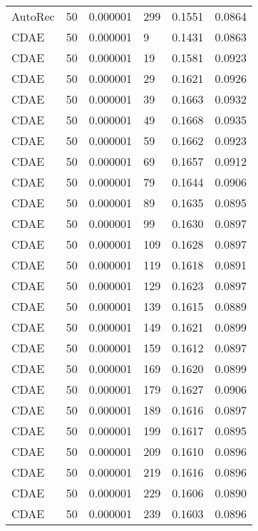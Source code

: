 \begin{tabular}{llrlrr}
 AutoRec &   50 &  0.000001 &   299 &  0.1551 &       0.0864 \\
    CDAE &   50 &  0.000001 &     9 &  0.1431 &       0.0863 \\
    CDAE &   50 &  0.000001 &    19 &  0.1581 &       0.0923 \\
    CDAE &   50 &  0.000001 &    29 &  0.1621 &       0.0926 \\
    CDAE &   50 &  0.000001 &    39 &  0.1663 &       0.0932 \\
    CDAE &   50 &  0.000001 &    49 &  0.1668 &       0.0935 \\
    CDAE &   50 &  0.000001 &    59 &  0.1662 &       0.0923 \\
    CDAE &   50 &  0.000001 &    69 &  0.1657 &       0.0912 \\
    CDAE &   50 &  0.000001 &    79 &  0.1644 &       0.0906 \\
    CDAE &   50 &  0.000001 &    89 &  0.1635 &       0.0895 \\
    CDAE &   50 &  0.000001 &    99 &  0.1630 &       0.0897 \\
    CDAE &   50 &  0.000001 &   109 &  0.1628 &       0.0897 \\
    CDAE &   50 &  0.000001 &   119 &  0.1618 &       0.0891 \\
    CDAE &   50 &  0.000001 &   129 &  0.1623 &       0.0897 \\
    CDAE &   50 &  0.000001 &   139 &  0.1615 &       0.0889 \\
    CDAE &   50 &  0.000001 &   149 &  0.1621 &       0.0899 \\
    CDAE &   50 &  0.000001 &   159 &  0.1612 &       0.0897 \\
    CDAE &   50 &  0.000001 &   169 &  0.1620 &       0.0899 \\
    CDAE &   50 &  0.000001 &   179 &  0.1627 &       0.0906 \\
    CDAE &   50 &  0.000001 &   189 &  0.1616 &       0.0897 \\
    CDAE &   50 &  0.000001 &   199 &  0.1617 &       0.0895 \\
    CDAE &   50 &  0.000001 &   209 &  0.1610 &       0.0896 \\
    CDAE &   50 &  0.000001 &   219 &  0.1616 &       0.0896 \\
    CDAE &   50 &  0.000001 &   229 &  0.1606 &       0.0890 \\
    CDAE &   50 &  0.000001 &   239 &  0.1603 &       0.0896 \\

\end{tabular}
